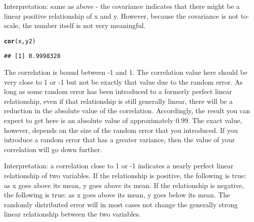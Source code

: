 \documentclass[12pt,letter]{article}\usepackage[]{graphicx}\usepackage[]{color}
\makeatletter
\newcommand{\hlstd}[1]{\textcolor[rgb]{0.345,0.345,0.345}{#1}}%
\newcommand{\hlkwd}[1]{\textcolor[rgb]{0.737,0.353,0.396}{\textbf{#1}}}%
\newenvironment{kframe}{%
 \def\at@end@of@kframe{}%
 \ifinner\ifhmode%
  \def\at@end@of@kframe{\end{minipage}}%
  \begin{minipage}{\columnwidth}%
 \fi\fi%
 \def\FrameCommand##1{\hskip\@totalleftmargin \hskip-\fboxsep
 \colorbox{shadecolor}{##1}\hskip-\fboxsep
     \hskip-\linewidth \hskip-\@totalleftmargin \hskip\columnwidth}%
 \MakeFramed {\advance\hsize-\width
   \@totalleftmargin\z@ \linewidth\hsize
   \@setminipage}}%
 {\par\unskip\endMakeFramed%
 \at@end@of@kframe}
\newenvironment{knitrout}{}{} %
\makeatother
\begin{document}
Interpretation: same as above - the covariance indicates that there might be a linear positive relationship of x and y. However, because the covariance is not to-scale, the number itself is not very meaningful.

\begin{knitrout}
\color{fgcolor}\begin{kframe}
\begin{alltt}
\hlkwd{cor}\hlstd{(x, y2)}
\end{alltt}
\begin{verbatim}
## [1] 0.9998328
\end{verbatim}
\end{kframe}
\end{knitrout}

The correlation is bound between -1 and 1. The correlation value here should be very close to 1 or -1 but not be exactly that value due to the random error. As long as some random error has been introduced to a formerly perfect linear relationship, even if that relationship is still generally linear, there will be a reduction in the absolute value of the correlation. Accordingly, the result you can expect to get here is an absolute value of approximately 0.99. The exact value, however, depends on the size of the random error that you introduced. If you introduce a random error that has a greater variance, then the value of your correlation will go down further.

Interpretation: a correlation close to 1 or -1 indicates a nearly perfect linear relationship of two variables. If the relationship is positive, the following is true: as x goes above its mean, y goes above its mean. If the relationship is negative, the following is true: as x goes above its mean, y goes below its mean. The randomly distributed error will in most cases not change the generally strong linear relationship between the two variables.
\end{document}
